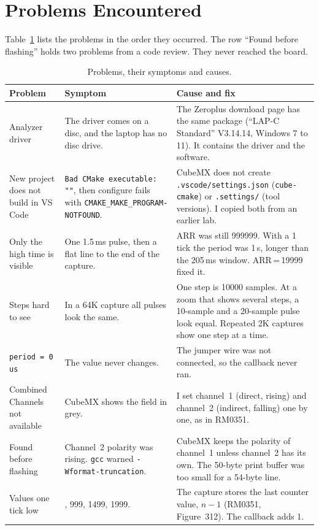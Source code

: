 \documentclass[11pt,a4paper]{article}
\newcommand{\us}{\,\text{\textmu s}}
\begin{document}
\section{Problems Encountered}

Table~\ref{tab:problems} lists the problems in the order they occurred. The
row ``Found before flashing'' holds two problems from a code review. They
never reached the board.

\begin{table}[H]
\centering
\caption{Problems, their symptoms and causes.}
\label{tab:problems}
\footnotesize
\begin{tabular}{@{}>{\raggedright\arraybackslash}p{2.9cm}%
                  >{\raggedright\arraybackslash}p{5.0cm}%
                  >{\raggedright\arraybackslash}p{7.3cm}@{}}
\toprule
Problem & Symptom & Cause and fix \\
\midrule
Analyzer driver &
  The driver comes on a disc, and the laptop has no disc drive. &
  The Zeroplus download page has the same package (``LAP-C Standard''
  V3.14.14, Windows 7 to 11). It contains the driver and the software. \\
New project does not build in VS Code &
  \texttt{Bad CMake executable: ""}, then configure fails with
  \texttt{CMAKE\_MAKE\_PROGRAM-NOTFOUND}. &
  CubeMX does not create \texttt{.vscode/settings.json}
  (\texttt{cube-cmake}) or \texttt{.settings/} (tool versions). I copied both
  from an earlier lab. \\
Only the high time is visible &
  One 1.5\,ms pulse, then a flat line to the end of the capture. &
  ARR was still 999999. With a 1\us{} tick the period was 1\,s, longer than
  the 205\,ms window. ARR\,=\,19999 fixed it. \\
Steps hard to see &
  In a 64K capture all pulses look the same. &
  One step is 10000 samples. At a zoom that shows several steps, a 10-sample
  and a 20-sample pulse look equal. Repeated 2K captures show one step at a
  time. \\
\texttt{period = 0 us} &
  The value never changes. &
  The jumper wire was not connected, so the callback never ran. \\
Combined Channels not available &
  CubeMX shows the field in grey. &
  I set channel~1 (direct, rising) and channel~2 (indirect, falling) one by
  one, as in RM0351. \\
Found before flashing &
  Channel~2 polarity was rising. \texttt{gcc} warned
  \texttt{-Wformat-truncation}. &
  CubeMX keeps the polarity of channel~1 unless channel~2 has its own. The
  50-byte print buffer was too small for a 54-byte line. \\
Values one tick low &
  19999, 999, 1499, 1999. &
  The capture stores the last counter value, $n-1$ (RM0351, Figure~312).
  The callback adds 1. \\
\bottomrule
\end{tabular}
\end{table}
\end{document}
